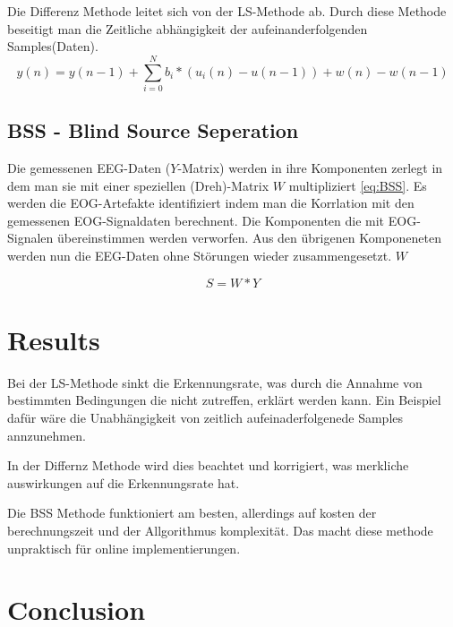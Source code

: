\documentclass[preprint,12pt]{elsarticle}
\begin{document}
Die Differenz Methode leitet sich von der LS-Methode ab. Durch diese Methode beseitigt man die Zeitliche abhängigkeit der aufeinanderfolgenden Samples(Daten).
~\cite{Thulasidas2004}
\begin{equation} \label{eq:DM}
 y(n) = y(n - 1) + \sum_{i=0}^{N}  b_i * (u_i(n) - u(n - 1)) + w(n) - w(n - 1)
\end{equation}



\subsection{BSS - Blind Source Seperation}
Die gemessenen EEG-Daten ($Y$-Matrix) werden in ihre Komponenten zerlegt in dem man sie mit einer speziellen (Dreh)-Matrix $W$ multipliziert \ref{eq:BSS}.
Es werden die EOG-Artefakte identifiziert indem man die Korrlation mit den gemessenen EOG-Signaldaten  berechnent. Die Komponenten die mit EOG-Signalen übereinstimmen werden
verworfen. Aus den übrigenen Komponeneten werden nun die EEG-Daten ohne Störungen wieder zusammengesetzt.
$W$
~\cite{Thulasidas2004}

\begin{equation} \label{eq:BSS}
 S = W*Y
\end{equation}



\section{Results}
Bei der LS-Methode sinkt die Erkennungsrate, was durch die Annahme von bestimmten Bedingungen die nicht zutreffen, erklärt werden kann.
 Ein Beispiel dafür wäre die Unabhängigkeit von zeitlich aufeinaderfolgenede Samples annzunehmen.

In der Differnz Methode wird dies beachtet und korrigiert, was merkliche auswirkungen auf die Erkennungsrate hat.

Die BSS Methode funktioniert am besten, allerdings auf kosten der berechnungszeit und der Allgorithmus komplexität.
Das macht diese methode unpraktisch für online implementierungen.

\section{Conclusion}






\end{document}
